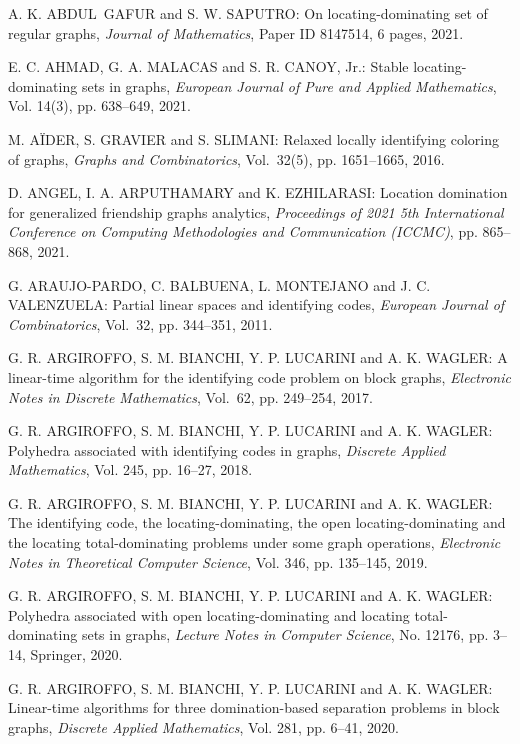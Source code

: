 \begin{thebibliography}{999}

A. K. ABDUL~GAFUR and S. W. SAPUTRO: On locating-dominating set of regular graphs, {\it Journal of Mathematics}, Paper ID 8147514, 6 pages, 2021.

E. C. AHMAD, G. A. MALACAS and S. R. CANOY, Jr.: Stable locating-dominating sets in graphs, {\it European Journal of Pure and Applied Mathematics}, Vol. 14(3), pp. 638--649, 2021.

M. A\"IDER, S. GRAVIER and S. SLIMANI: Relaxed locally identifying coloring of graphs, {\it Graphs and Combinatorics}, Vol.~32(5), pp. 1651--1665, 2016.

D. ANGEL, I. A. ARPUTHAMARY and K. EZHILARASI: Location domination for generalized friendship graphs analytics, {\it Proceedings of 2021 5th International Conference on Computing Methodologies and Communication (ICCMC)}, pp. 865--868, 2021.

G. ARAUJO-PARDO, C. BALBUENA, L. MONTEJANO and J. C. VALENZUELA: Partial linear spaces and identifying codes, {\it European Journal of Combinatorics}, Vol.~32, pp. 344--351, 2011.

G. R. ARGIROFFO, S. M. BIANCHI, Y. P. LUCARINI and A. K. WAGLER: A linear-time algorithm for the identifying code problem on block graphs, {\it Electronic Notes in Discrete Mathematics}, Vol.~62, pp. 249--254, 2017.

G. R. ARGIROFFO, S. M. BIANCHI, Y. P. LUCARINI and A. K. WAGLER: Polyhedra associated with identifying codes in graphs, {\it Discrete Applied Mathematics}, Vol. 245, pp. 16--27, 2018.

G. R. ARGIROFFO, S. M. BIANCHI, Y. P. LUCARINI and A. K. WAGLER: The identifying code, the locating-dominating, the open locating-dominating and the locating total-dominating problems under some graph operations, {\it Electronic Notes in Theoretical Computer Science}, Vol. 346, pp. 135--145, 2019.

G. R. ARGIROFFO, S. M. BIANCHI, Y. P. LUCARINI and A. K. WAGLER: Polyhedra associated with open locating-dominating and locating total-dominating sets in graphs, {\it Lecture Notes in Computer Science}, No. 12176, pp. 3--14, Springer, 2020.

G. R. ARGIROFFO, S. M. BIANCHI, Y. P. LUCARINI and A. K. WAGLER: Linear-time algorithms for three domination-based separation problems in block graphs, {\it Discrete Applied Mathematics}, Vol. 281, pp. 6--41, 2020.


\end{thebibliography}
